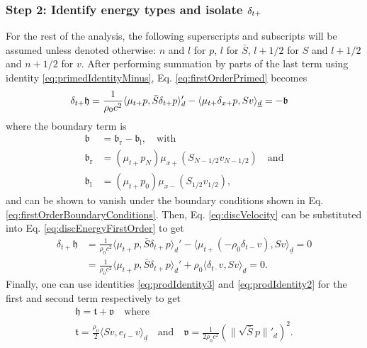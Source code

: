 {\subsubsection{Step 2: Identify energy types and isolate $\delta_{t+}$}
For the rest of the analysis, the following superscripts and subscripts will be assumed unless denoted otherwise: $n$ and $l$ for $p$, $l$ for $\bar S$, $l+1/2$ for $S$ and $l+1/2$ and $n+1/2$ for $v$. After performing summation by parts of the last term using identity \eqref{eq:primedIdentityMinus}, Eq. \eqref{eq:firstOrderPrimed} becomes
\begin{equation}\label{eq:discEnergyFirstOrder}
    \delta_{t+}\mathfrak{h} = \frac{1}{\rho_0 c^2}\langle \mu_{t+}p, \bar S \delta_{t+}p \rangle_{d}' -\langle \mu_{t+}\delta_{x+} p, Sv\rangle_{\underline{d}} = -\mathfrak{b} \quad \end{equation}
where the boundary term is
\begin{align}
    \mathfrak{b} &= \mathfrak{b}_\text{r} - \mathfrak{b}_\text{l}, \quad \text{with} \nonumber\\
    \mathfrak{b}_\text{r} &= (\mu_{t+}p_N)\mu_{x+}(S_{N-1/2}v_{N-1/2})\quad \text{and}\label{eq:firstOrderRightBoundary}\\
    \mathfrak{b}_\text{l} &= (\mu_{t+}p_0)\mu_{x-}(S_{1/2}v_{1/2})\label{eq:firstOrderLeftBoundary},
\end{align}
and can be shown to vanish under the boundary conditions shown in Eq. \eqref{eq:firstOrderBoundaryConditions}. Then, Eq. \eqref{eq:discVelocity} can be substituted into Eq. \eqref{eq:discEnergyFirstOrder} to get
\begin{align}
    \delta_{t+}\mathfrak{h} &= \frac{1}{\rho_0 c^2}\langle \mu_{t+}p, \bar S \delta_{t+}p \rangle_{d}' -\langle \mu_{t+}(-\rho_0\delta_{t-}v), Sv\rangle_{\underline{d}} = 0\\
    &= \frac{1}{\rho_0 c^2}\langle \mu_{t+}p, \bar S \delta_{t+}p \rangle_{d}' + \rho_0 \langle \delta_{t\cdot}v, Sv\rangle_{\underline{d}} = 0.
\end{align}
Finally, one can use identities \eqref{eq:prodIdentity3} and \eqref{eq:prodIdentity2} for the first and second term respectively to get
\begin{equation}\label{eq:energyBalanceFirstOrder}
    \begin{gathered}
        \mathfrak{h} = \mathfrak{t} + \mathfrak{v}\quad \text{where}\\
       \mathfrak{t} = \frac{\rho_0}{2}\langle Sv, e_{t-}v\rangle_{\underline{d}}\quad \text{and} \quad \mathfrak{v} = \frac{1}{2\rho_0 c^2}\left(\lVert\sqrt{\bar S }p\rVert'_d\right)^2.
    \end{gathered}
\end{equation}
}

